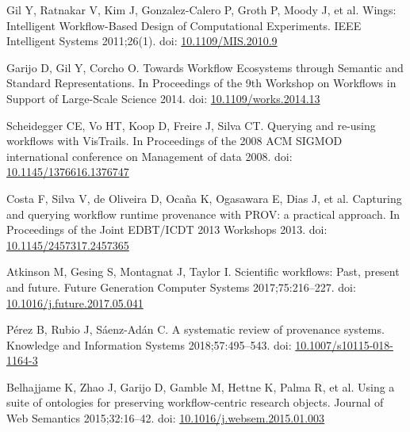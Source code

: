 \documentclass[10pt,letterpaper]{article}
\begin{document}
\begin{thebibliography}{10}
\begin{small}

Gil Y, Ratnakar V, Kim J, Gonzalez-Calero P, Groth P, Moody J, et al.
Wings: Intelligent Workflow-Based Design of Computational Experiments.
IEEE Intelligent Systems 2011;26(1).
doi: \href{https://doi.org/10.1109/MIS.2010.9}{10.1109/MIS.2010.9}

Garijo D, Gil Y, Corcho O.
Towards Workflow Ecosystems through Semantic and Standard Representations.
In Proceedings of the 9th Workshop on Workflows in Support of Large-Scale Science 2014.
doi: \href{https://doi.org/10.1109/works.2014.13}{10.1109/works.2014.13}

Scheidegger CE, Vo HT, Koop D, Freire J, Silva CT.
Querying and re-using workflows with VisTrails.
In Proceedings of the 2008 ACM SIGMOD international conference on Management of data 2008.
doi: \href{https://doi.org/10.1145/1376616.1376747}{10.1145/1376616.1376747}

Costa F, Silva V, de Oliveira D, Ocaña K, Ogasawara E, Dias J, et al.
Capturing and querying workflow runtime provenance with PROV: a practical approach.
In Proceedings of the Joint EDBT/ICDT 2013 Workshops 2013.
doi: \href{https://doi.org/10.1145/2457317.2457365}{10.1145/2457317.2457365}

Atkinson M, Gesing S, Montagnat J, Taylor I.
Scientific workflows: Past, present and future.
Future Generation Computer Systems 2017;75:216--227.
doi: \href{https://doi.org/10.1016/j.future.2017.05.041}{10.1016/j.future.2017.05.041}

Pérez B, Rubio J, Sáenz-Adán C.
A systematic review of provenance systems.
Knowledge and Information Systems 2018;57:495--543.
doi: \href{https://doi.org/10.1007/s10115-018-1164-3}{10.1007/s10115-018-1164-3}

Belhajjame K, Zhao J, Garijo D, Gamble M, Hettne K, Palma R, et al.
Using a suite of ontologies for preserving workflow-centric research objects.
Journal of Web Semantics 2015;32:16--42.
doi: \href{https://doi.org/10.1016/j.websem.2015.01.003}{10.1016/j.websem.2015.01.003}


\end{small}
\end{thebibliography}
\end{document}
